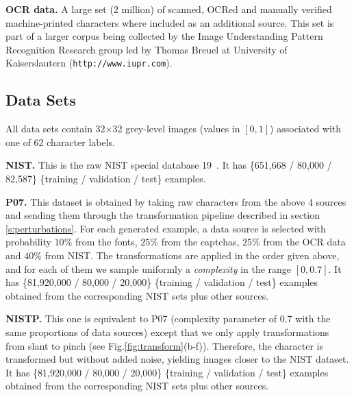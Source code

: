 \documentclass{article} %
\begin{document}
{\bf OCR data.}
A large set (2 million) of scanned, OCRed and manually verified machine-printed 
characters where included as an
additional source. This set is part of a larger corpus being collected by the Image Understanding
Pattern Recognition Research group led by Thomas Breuel at University of Kaiserslautern 
({\tt http://www.iupr.com}).%

\subsection{Data Sets}

All data sets contain 32$\times$32 grey-level images (values in $[0,1]$) associated with one of 62 character labels.

{\bf NIST.} This is the raw NIST special database 19~\citep{Grother-1995}. It has
\{651,668 / 80,000 / 82,587\} \{training / validation / test\} examples.

{\bf P07.} This dataset is obtained by taking raw characters from the above 4 sources
and sending them through the transformation pipeline described in section \ref{s:perturbations}.
For each generated example, a data source is selected with probability $10\%$ from the fonts,
$25\%$ from the captchas, $25\%$ from the OCR data and $40\%$ from NIST. The transformations are 
applied in the
order given above, and for each of them we sample uniformly a \emph{complexity} in the range $[0,0.7]$.
It has \{81,920,000 / 80,000 / 20,000\} \{training / validation / test\} examples
obtained from the corresponding NIST sets plus other sources.

{\bf NISTP.} This one is equivalent to P07 (complexity parameter of $0.7$ with the same proportions of data sources)
  except that we only apply
  transformations from slant to pinch (see Fig.\ref{fig:transform}(b-f)).
  Therefore, the character is
  transformed but without added noise, yielding images
  closer to the NIST dataset. 
It has \{81,920,000 / 80,000 / 20,000\} \{training / validation / test\} examples
obtained from the corresponding NIST sets plus other sources.
\end{document}
